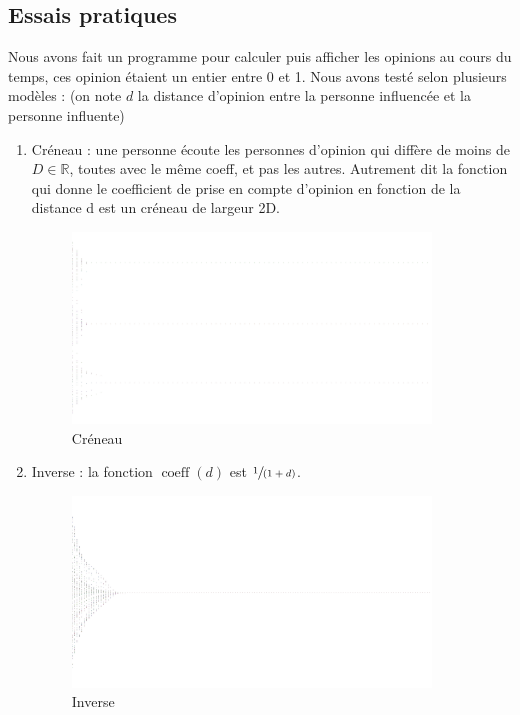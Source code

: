 \documentclass[a4paper,10pt]{article}
\begin{document}
\subsection{Essais pratiques}

Nous avons fait un programme pour calculer puis afficher les opinions au cours du temps, ces opinion étaient un entier entre 0 et 1. Nous avons testé selon plusieurs modèles : (on note $d$ la distance d'opinion entre la personne influencée et la personne influente)
\begin{enumerate}
\item Créneau : une personne écoute les personnes d'opinion qui diffère de moins de $D \in \mathbb{R}$, toutes avec le même coeff, et pas les autres. Autrement dit la fonction qui donne le coefficient de prise en compte d'opinion en fonction de la distance d est un créneau de largeur 2D.

\begin{figure}[H]
\begin{center}
\includegraphics[width=270pt]{resultatCreneau_inverse.png}
\end{center}
\caption{Créneau}
\label{sim_creneau}
\end{figure}

\item Inverse : la fonction $\operatorname{coeff}(d)$ est $\sfrac{1}{(1+d)}$.

\begin{figure}[H]
\begin{center}
\includegraphics[width=270pt]{resultatInverse_inverse.png}
\end{center}
\caption{Inverse}
\label{sim_inverse}
\end{figure}


\end{enumerate}
\end{document}
